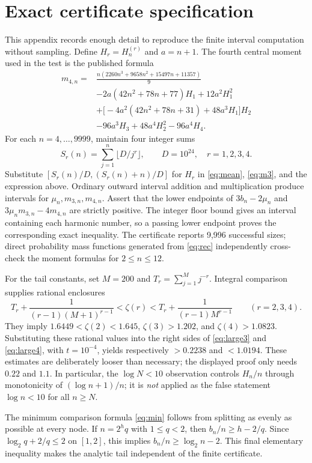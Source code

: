 \documentclass[10pt,letterpaper]{article}
\begin{document}
\section{Exact certificate specification}
This appendix records enough detail to reproduce the finite interval computation without sampling. Define $H_r=H_n^{(r)}$ and $a=n+1$. The fourth central moment used in the test is the published formula \cite{yao}
\begin{align*}
m_{4,n}={}&\frac{n(2260n^3+9658n^2+15497n+11357)}9\\
&-2a(42n^2+78n+77)H_1+12a^2H_1^2\\
&+\bigl[-4a^2(42n^2+78n+31)+48a^3H_1\bigr]H_2\\
&-96a^3H_3+48a^4H_2^2-96a^4H_4.
\end{align*}
For each $n=4,\ldots,9999$, maintain four integer sums
\[S_r(n)=\sum_{j=1}^{n}\lfloor D/j^r\rfloor,\qquad D=10^{24},\quad r=1,2,3,4.\]
Substitute $[S_r(n)/D,(S_r(n)+n)/D]$ for $H_r$ in \eqref{eq:mean}, \eqref{eq:m3}, and the expression above. Ordinary outward interval addition and multiplication produce intervals for $\mu_n,m_{3,n},m_{4,n}$. Assert that the lower endpoints of $3b_n-2\mu_n$ and $3\mu_nm_{3,n}-4m_{4,n}$ are strictly positive. The integer floor bound gives an interval containing each harmonic number, so a passing lower endpoint proves the corresponding exact inequality. The certificate reports 9,996 successful sizes; direct probability mass functions generated from \eqref{eq:rec} independently cross-check the moment formulas for $2\le n\le12$.

For the tail constants, set $M=200$ and $T_r=\sum_{j=1}^{M}j^{-r}$. Integral comparison supplies rational enclosures
\[T_r+\frac1{(r-1)(M+1)^{r-1}}<\zeta(r)<T_r+\frac1{(r-1)M^{r-1}}\qquad(r=2,3,4).\]
They imply $1.6449<\zeta(2)<1.645$, $\zeta(3)>1.202$, and $\zeta(4)>1.0823$. Substituting these rational values into the right sides of \eqref{eq:large3} and \eqref{eq:large4}, with $t=10^{-4}$, yields respectively $>0.2238$ and $<1.0194$. These estimates are deliberately looser than necessary; the displayed proof only needs $0.22$ and $1.1$. In particular, the $\log N<10$ observation controls $H_n/n$ through monotonicity of $(\log n+1)/n$; it is \emph{not} applied as the false statement $\log n<10$ for all $n\ge N$.

The minimum comparison formula \eqref{eq:min} follows from splitting as evenly as possible at every node. If $n=2^h q$ with $1\le q<2$, then $b_n/n\ge h-2/q$. Since $\log_2 q+2/q\le2$ on $[1,2]$, this implies $b_n/n\ge\log_2 n-2$. This final elementary inequality makes the analytic tail independent of the finite certificate.
\end{document}
